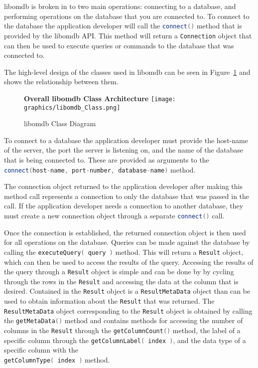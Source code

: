 \documentclass[letterpaper, 11pt]{article}
\newcommand{\inlinecode}[1]{\colorbox{codegrey}{\lstinline[language=C++]{#1}}}
\begin{document}
  libomdb is broken in to two main operations: connecting to a database, and performing
  operations on the database that you are connected to. To connect to the database
  the application developer will call the
  \inlinecode{connect()} method that is provided by the libomdb API.
  This method will return a \inlinecode{Connection} object that can
  then be used to execute queries or commands to the database that was connected to.
  \par\vspace{\baselineskip}
  
  The high-level design of the classes used in libomdb can be seen in Figure~\ref{fig:lib_class}
  and shows the relationship between them.

  \begin{figure}[H]
    \centering
    \textbf{Overall libomdb Class Architecture}
    \texttt{[image: graphics/libomdb\_Class.png]}
    \caption{libomdb Class Diagram}
    \label{fig:lib_class}
  \end{figure}

  To connect to a database the application developer must provide the
  host-name of the server, the port the server is listening on, and the name of the
  database that is being connected to. These are provided as arguments to the
  \inlinecode{connect(host-name, port-number, database-name)}
  method.
  \par\vspace{\baselineskip}
  The connection object returned to the application developer after making this method
  call represents a connection to only the database that was passed in the call. If the
  application developer needs a connection to another database, they must create a new
  connection object through a separate
  \inlinecode{connect()} call.
  \par\vspace{\baselineskip}
  Once the connection is established, the returned connection object is then used for all
  operations on the database. Queries can be made against the database by calling
  the \inlinecode{executeQuery( query )}
  method. This will return a \inlinecode{Result} object, which can
  then be used to access the results of the query. Accessing the results of the query
  through a \inlinecode{Result} object is simple and can be done by
  by cycling through the rows in the
  \inlinecode{Result} and accessing the data at the column that
  is desired. Contained in the \inlinecode{Result} object is a
  \inlinecode{ResultMetaData} object than can be used to obtain
  information about the \inlinecode{Result} that was returned.
  The \inlinecode{ResultMetaData} object corresponding to the
  \inlinecode{Result} object is obtained by calling the
  \inlinecode{getMetaData()} method and contains
  methods for accessing the number of columns in the
  \inlinecode{Result} through the
  \inlinecode{getColumnCount()} method, the
  label of a specific column through the
  \inlinecode{getColumnLabel( index )},
  and the data type of a specific column with the \\
  \inlinecode{getColumnType( index )} method.
  \par\vspace{\baselineskip}
  
\end{document}
